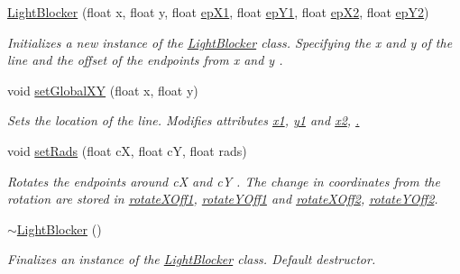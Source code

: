 \begin{DoxyCompactItemize}
\item 
\hyperlink{classlighting_1_1LightBlocker_a3a6c6d10ce50969937c4c06c4842fa16}{Light\+Blocker} (float x, float y, float \hyperlink{classlighting_1_1LightBlocker_a3c030005ee4af11838011f549ec0b4c3}{ep\+X1}, float \hyperlink{classlighting_1_1LightBlocker_a2d8e512751df14bff73c59e3bfaea216}{ep\+Y1}, float \hyperlink{classlighting_1_1LightBlocker_a01cf6b4663389c17b5f80294a2b26401}{ep\+X2}, float \hyperlink{classlighting_1_1LightBlocker_ac208ae1dafe53ec7ceab6d60113c6ca1}{ep\+Y2})
\begin{DoxyCompactList}\small\item\em Initializes a new instance of the \hyperlink{classlighting_1_1LightBlocker}{Light\+Blocker} class. Specifying the {\itshape x}  and {\itshape y}  of the line and the offset of the endpoints from {\itshape x}  and {\itshape y} . \end{DoxyCompactList}\item 
void \hyperlink{classlighting_1_1LightBlocker_aca52033e87e21fbe0a2574447ed05a3d}{set\+Global\+XY} (float x, float y)
\begin{DoxyCompactList}\small\item\em Sets the location of the line. Modifies attributes \hyperlink{classlighting_1_1LightBlocker_acb89235bf9b478b8242e0bf3a1ca863c}{x1}, \hyperlink{classlighting_1_1LightBlocker_ad988b4727c60d6e83a8fca2d7eabbdec}{y1} and \hyperlink{classlighting_1_1LightBlocker_aaeb1641f4d28d66c4d89045c6053a29a}{x2}, \hyperlink{classlighting_1_1LightBlocker_a69fdb1256cab66b415a76b9f63af4284}{. } \end{DoxyCompactList}\item 
void \hyperlink{classlighting_1_1LightBlocker_a1fe1c13013aeee813526ae74cd5a984c}{set\+Rads} (float cX, float cY, float rads)
\begin{DoxyCompactList}\small\item\em Rotates the endpoints around {\itshape cX}  and {\itshape cY} . The change in coordinates from the rotation are stored in \hyperlink{classlighting_1_1LightBlocker_a51b85e054f0ffaf8ae51d305b62e6a6f}{rotate\+X\+Off1}, \hyperlink{classlighting_1_1LightBlocker_a3c9c30ae0058e5f97b13c785f9ab879a}{rotate\+Y\+Off1} and \hyperlink{classlighting_1_1LightBlocker_a5e08ff3bf8f8f26b8660f95114184b5c}{rotate\+X\+Off2}, \hyperlink{classlighting_1_1LightBlocker_aea5301a408a819c955c9227ff6a41009}{rotate\+Y\+Off2}. \end{DoxyCompactList}\item 
\hyperlink{classlighting_1_1LightBlocker_ac185b4f1d32b6ac15c247e42fa9dcb00}{$\sim$\+Light\+Blocker} ()
\begin{DoxyCompactList}\small\item\em Finalizes an instance of the \hyperlink{classlighting_1_1LightBlocker}{Light\+Blocker} class. Default destructor. \end{DoxyCompactList}\end{DoxyCompactItemize}
